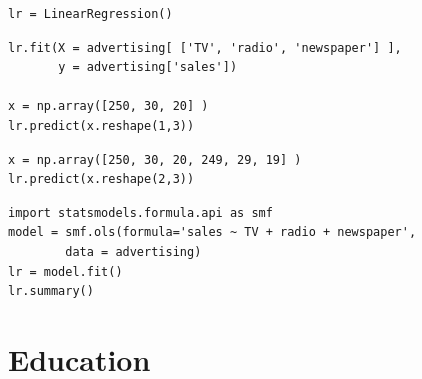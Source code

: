 \begin{frame}[fragile]
\tiny
\begin{lstlisting}
lr = LinearRegression()
\end{lstlisting}
\pause
\begin{lstlisting}
lr.fit(X = advertising[ ['TV', 'radio', 'newspaper'] ], 
       y = advertising['sales'])

x = np.array([250, 30, 20] )
lr.predict(x.reshape(1,3))
\end{lstlisting}
\pause
\begin{lstlisting}
x = np.array([250, 30, 20, 249, 29, 19] )
lr.predict(x.reshape(2,3))
\end{lstlisting}
\end{frame}

\begin{frame}[fragile]
\tiny
\begin{lstlisting}
import statsmodels.formula.api as smf
model = smf.ols(formula='sales ~ TV + radio + newspaper', 
		data = advertising)
lr = model.fit()
lr.summary()
\end{lstlisting}
\end{frame}


\section{Education}



